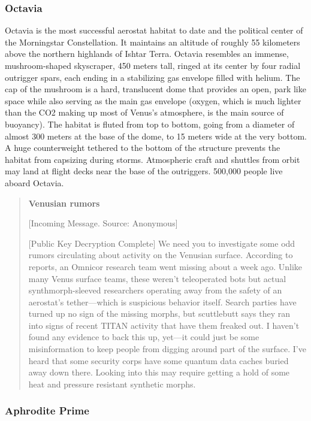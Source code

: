 \subsubsection{Octavia} \label{sec:octavia} 

Octavia is the most successful aerostat habitat to date and the political center of the Morningstar Constellation. It maintains an altitude of roughly 55 kilometers above the northern highlands of Ishtar Terra. Octavia resembles an immense, mushroom-shaped skyscraper, 450 meters tall, ringed at its center by four radial outrigger spars, each ending in a stabilizing gas envelope filled with helium. The cap of the mushroom is a hard, translucent dome that provides an open, park like space while also serving as the main gas envelope (oxygen, which is much lighter than the CO2 making up most of Venus's atmosphere, is the main source of buoyancy). The habitat is fluted from top to bottom, going from a diameter of almost 300 meters at the base of the dome, to 15 meters wide at the very bottom. A huge counterweight tethered to the bottom of the structure prevents the habitat from capsizing during storms. Atmospheric craft and shuttles from orbit may land at flight decks near the base of the outriggers. 500,000 people live aboard Octavia. 

\begin{quotation} \textbf{Venusian rumors} 

[Incoming Message. Source: Anonymous] 

[Public Key Decryption Complete] We need you to investigate some odd rumors circulating about activity on the Venusian surface. According to reports, an Omnicor research team went missing about a week ago. Unlike many Venus surface teams, these weren't teleoperated bots but actual synthmorph-sleeved researchers operating away from the safety of an aerostat's tether—which is suspicious behavior itself. Search parties have turned up no sign of the missing morphs, but scuttlebutt says they ran into signs of recent TITAN activity that have them freaked out. I haven't found any evidence to back this up, yet—it could just be some misinformation to keep people from digging around part of the surface. I've heard that some security corps have some quantum data caches buried away down there. Looking into this may require getting a hold of some heat and pressure resistant synthetic morphs. \end{quotation} 

\subsubsection{Aphrodite Prime} \label{sec:aphrodite-prime} 


